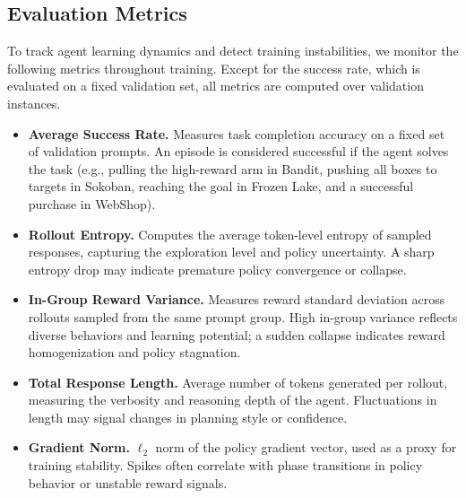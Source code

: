 \subsection{Evaluation Metrics}
\label{app:metric-setting}

To track agent learning dynamics and detect training instabilities, we monitor the following metrics throughout training. Except for the success rate, which is evaluated on a fixed validation set, all metrics are computed over validation instances.

\begin{itemize}
    \item \textbf{Average Success Rate.} Measures task completion accuracy on a fixed set of validation prompts. An episode is considered successful if the agent solves the task (e.g., pulling the high-reward arm in Bandit, pushing all boxes to targets in Sokoban, reaching the goal in Frozen Lake, and a successful purchase in WebShop).

    \item \textbf{Rollout Entropy.} Computes the average token-level entropy of sampled responses, capturing the exploration level and policy uncertainty. A sharp entropy drop may indicate premature policy convergence or collapse.


    \item \textbf{In-Group Reward Variance.} Measures reward standard deviation across rollouts sampled from the same prompt group. High in-group variance reflects diverse behaviors and learning potential; a sudden collapse indicates reward homogenization and policy stagnation.

    \item \textbf{Total Response Length.} Average number of tokens generated per rollout, measuring the verbosity and reasoning depth of the agent. Fluctuations in length may signal changes in planning style or confidence.

    \item \textbf{Gradient Norm.} $\ell_2$ norm of the policy gradient vector, used as a proxy for training stability. Spikes often correlate with phase transitions in policy behavior or unstable reward signals.

\end{itemize}

